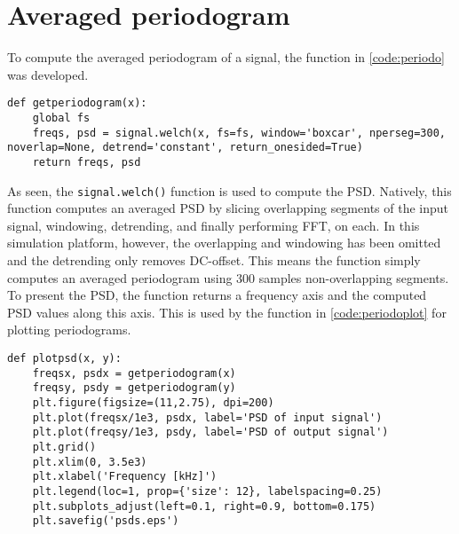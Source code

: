 

\section{Averaged periodogram}
To compute the averaged periodogram of a signal, the function in \cref{code:periodo} was developed.

\lstset{language=python,caption=Function for computing averaged periodogram,label=code:periodo}
\begin{lstlisting}
def getperiodogram(x):
    global fs
    freqs, psd = signal.welch(x, fs=fs, window='boxcar', nperseg=300, noverlap=None, detrend='constant', return_onesided=True)
    return freqs, psd
\end{lstlisting}

As seen, the \texttt{signal.welch()} function is used to compute the PSD. Natively, this function computes an averaged PSD by slicing overlapping segments of the input signal, windowing, detrending, and finally performing FFT, on each. In this simulation platform, however, the overlapping and windowing has been omitted and the detrending only removes DC-offset. This means the function simply computes an averaged periodogram using 300 samples non-overlapping segments. To present the PSD, the function returns a frequency axis and the computed PSD values along this axis. This is used by the function in \cref{code:periodoplot} for plotting periodograms.

\lstset{language=python,caption=Function for plotting periodogram of in- and output signals,label=code:periodoplot}
\begin{lstlisting}
def plotpsd(x, y):
    freqsx, psdx = getperiodogram(x)
    freqsy, psdy = getperiodogram(y)
    plt.figure(figsize=(11,2.75), dpi=200)  
    plt.plot(freqsx/1e3, psdx, label='PSD of input signal')
    plt.plot(freqsy/1e3, psdy, label='PSD of output signal')
    plt.grid()
    plt.xlim(0, 3.5e3)
    plt.xlabel('Frequency [kHz]')
    plt.legend(loc=1, prop={'size': 12}, labelspacing=0.25)
    plt.subplots_adjust(left=0.1, right=0.9, bottom=0.175)
    plt.savefig('psds.eps') 
\end{lstlisting}

